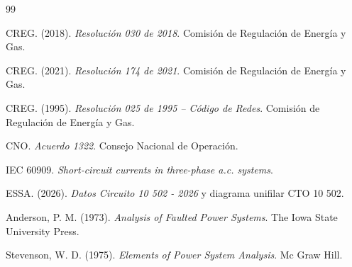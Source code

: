 \documentclass[12pt,a4paper,oneside]{book}
\begin{document}









\begin{thebibliography}{99}

 CREG. (2018). \textit{Resolución 030 de 2018}. Comisión de Regulación de Energía y Gas.

 CREG. (2021). \textit{Resolución 174 de 2021}. Comisión de Regulación de Energía y Gas.

 CREG. (1995). \textit{Resolución 025 de 1995 -- Código de Redes}. Comisión de Regulación de Energía y Gas.

 CNO. \textit{Acuerdo 1322}. Consejo Nacional de Operación.

 IEC 60909. \textit{Short-circuit currents in three-phase a.c. systems}.

 ESSA. (2026). \textit{Datos Circuito 10 502 - 2026} y diagrama unifilar CTO 10 502.

 Anderson, P. M. (1973). \textit{Analysis of Faulted Power Systems}. The Iowa State University Press.

 Stevenson, W. D. (1975). \textit{Elements of Power System Analysis}. Mc Graw Hill.

\end{thebibliography}

\appendix


\end{document}

